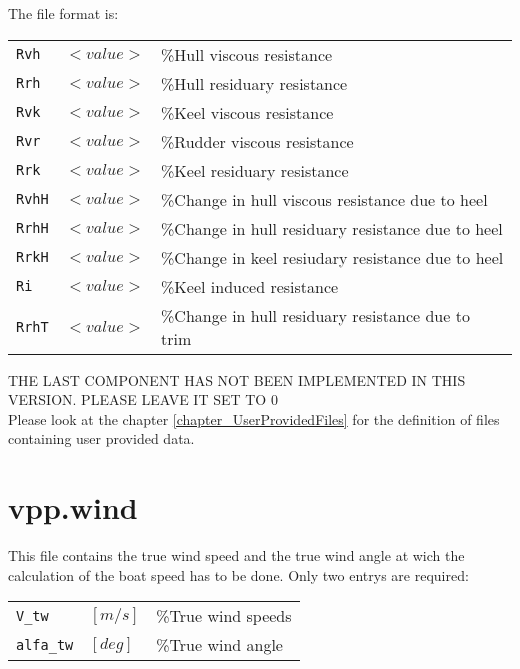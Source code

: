 \documentclass[a4paper,openany]{memoir}
\begin{document}
The file format is:
\begin{center}
  \begin{tabular}{l l l}
    \texttt{Rvh}		&${<value>}$ 	&\%Hull viscous resistance\\
    \texttt{Rrh}		&${<value>}$ 	&\%Hull residuary resistance\\
    \texttt{Rvk}		&${<value>}$ 	&\%Keel viscous resistance\\
    \texttt{Rvr}		&${<value>}$ 	&\%Rudder viscous resistance\\
    \texttt{Rrk}		&${<value>}$ 	&\%Keel residuary resistance\\
    \texttt{RvhH}		&${<value>}$ 	&\%Change in hull viscous resistance due to heel\\
    \texttt{RrhH}		&${<value>}$ 	&\%Change in hull residuary resistance due to heel\\
    \texttt{RrkH}		&${<value>}$ 	&\%Change in keel resiudary resistance due to heel\\
    \texttt{Ri}		&${<value>}$ 	&\%Keel induced resistance\\
    \texttt{RrhT} 		&${<value>}$ 	&\%Change in hull residuary resistance due to trim\\
  \end{tabular}
\end{center}

THE LAST COMPONENT HAS NOT BEEN IMPLEMENTED IN THIS VERSION. PLEASE LEAVE IT SET TO 0\\
Please look at the chapter \ref{chapter_UserProvidedFiles} for the definition of files containing user provided data.


\section{vpp.wind}

This file contains the true wind speed and the true wind angle at wich the calculation of the boat speed has to be done. Only two entrys are required:\\

\begin{table}[h]
  \centering
  \begin{tabular}{l l l}
    \texttt{V\_tw}		&${[m/s]}$	&\%True wind speeds\\
    \texttt{alfa\_tw}	&${[deg]}$	&\%True wind angle\\
  \end{tabular}
\end{table}
\end{document}
